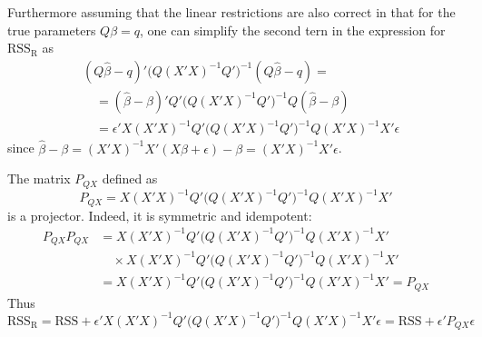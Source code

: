 \documentclass[a4paper]{article}
\newcommand{\R}{\text{R}}
\newcommand{\RSS}{\text{RSS}}
\begin{document}
Furthermore assuming that the linear restrictions are also correct in that for the true parameters $Q\beta = q$, one can simplify the second tern in the expression for $\RSS_\R$ as
\begin{align*}
	&(Q\hat{\beta}-q)'\big(Q(X'X)^{-1}Q'\big)^{-1}(Q\hat{\beta}-q) = \\
	&\quad= (\hat{\beta}-\beta)'Q'\big(Q(X'X)^{-1}Q'\big)^{-1}Q(\hat{\beta}-\beta)\\
	&\quad= \epsilon'X(X'X)^{-1}Q'\big(Q(X'X)^{-1}Q'\big)^{-1}Q(X'X)^{-1}X'\epsilon
\end{align*}
since $\hat{\beta}-\beta = (X'X)^{-1}X'(X\beta + \epsilon) - \beta = (X'X)^{-1}X'\epsilon$.

The matrix $P_{QX}$ defined as 
\[P_{QX} = X(X'X)^{-1}Q'\big(Q(X'X)^{-1}Q'\big)^{-1}Q(X'X)^{-1}X'\]
is a projector. Indeed, it is symmetric and idempotent:
\begin{align*}
	P_{QX} P_{QX}
	&= X(X'X)^{-1}Q'\big(Q(X'X)^{-1}Q'\big)^{-1}Q(X'X)^{-1}X'\\
	&\quad\times X(X'X)^{-1}Q'\big(Q(X'X)^{-1}Q'\big)^{-1}Q(X'X)^{-1}X' \\ 
	&= X(X'X)^{-1}Q'\big(Q(X'X)^{-1}Q'\big)^{-1}Q(X'X)^{-1}X' = P_{QX}
\end{align*}
Thus 
\[\RSS_\R = \RSS + \epsilon'X(X'X)^{-1}Q'\big(Q(X'X)^{-1}Q'\big)^{-1}Q(X'X)^{-1}X'\epsilon = \RSS + \epsilon' P_{QX} \epsilon\]
\end{document}
